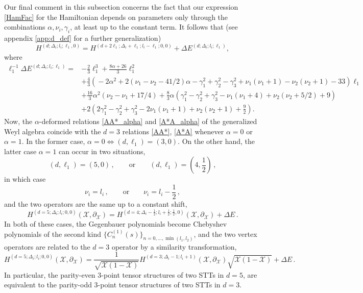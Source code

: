 \documentclass{article}
\def \Dg {\Delta}
\def \ds {\partial}
\def \ag {\alpha}
\def \cg {\gamma}
\begin{document}
Our final comment in this subsection concerns the fact that our expression \eqref{HamFac}
for the Hamiltonian depends on parameters only through the 
combinations $\ag,\nu_i,\cg_i$, 
at least up to the constant term. It follows that (see appendix \ref{app:d_def} for a 
further generalization)
\begin{equation}
    H^{(d;\Dg_i;l_i;\ell_1,0)} = H^{(d+2\ell_1;\Dg_i+\ell_1;l_i-\ell_1;0,0)} + 
    \Dg E^{(d;\Dg_i;l_i;\ell_1)},
    \label{dim_shift}
\end{equation}
where
\begin{align*}
\ell_1^{-1}\Dg E^{(d;\Dg_i;l_i;\ell_1)} =& -\frac{2}{3} \ell_1^3 + \frac{8 \ag + 26}{3}  \ell_1^2 \\
&+ \frac{4}{3}\left(\! -2\ag^2+ 2(\nu_1-\nu_2-41/2)\ag -\cg_1^2 +\cg_2^2-\cg_3^2 +
\nu_1(\nu_1+1) - \nu_2(\nu_2+1)   -33 \! \right)\! \ell_1\\
&+ \frac{16}{3} \ag^2 ( \nu_2-\nu_1 + 17/4)+ \frac{8}{3} \ag
\left(\cg_1^2-\cg_2^2+\cg_3^2-\nu_1(\nu_1+4) + \nu_2(\nu_2+5/2) +9 \right) \\
&+ 2 \left(2\cg_1^2-\cg_2^2+\cg_3^2-2\nu_1(\nu_1+1) +\nu_2(\nu_2+1) +\frac{9}{2} \right).
\end{align*}
Now, the $\ag$-deformed relations \eqref{AA*_alpha} and \eqref{A*A_alpha}  of the generalized 
Weyl algebra coincide with the $d=3$ relations \eqref{AA*}, \eqref{A*A} whenever $\ag = 0$ 
or $\ag =1$. In the former case, $\ag = 0 \iff (d,\ell_1) = (3,0)$. On the other hand, the 
latter case $\ag=1$ can occur in two situations,
\begin{equation}
(d,\ell_1) = (5,0)\,,\qquad \mathrm{or} \qquad (d,\ell_1) = (4,\frac{1}{2})\,, 
\end{equation}
in which case
\begin{equation}
\nu_i = l_i\,,\qquad \mathrm{or} \qquad \nu_i = l_i - \frac{1}{2}\,, 
\end{equation}
and the two operators are the same up to a constant shift,
\begin{equation}
    H^{(d=5;\Dg_i;l_i;0,0)}(\mathcal{X},\ds_{\mathcal{X}}) = 
    H^{(d=4;\Dg_i-\frac{1}{2};l_i+\frac{1}{2};\frac{1}{2},0)}(\mathcal{X},\ds_{\mathcal{X}})+\Dg E\,.
\end{equation}
In both of these cases, the Gegenbauer polynomials become Chebyshev polynomials of the second 
kind $\{ C_n^{(1)}(s)\}_{n=0,\dots, \min(l_1,l_2)}$, and the two vertex operators are related 
to the $d=3$ operator by a similarity transformation,
\begin{equation}
 H^{(d=5;\Dg_i;l_i;0,0)}(\mathcal{X},\ds_{\mathcal{X}})  =
    \frac{1}{\sqrt{\mathcal{X}(1-\mathcal{X})}} H^{(d=3;\Dg_i-1;l_i+1)}(\mathcal{X},
    \ds_{\mathcal{X}})    \sqrt{\mathcal{X}(1-\mathcal{X})} + \Dg E\,.
\end{equation}
In particular, the parity-even 3-point tensor structures of two STTs in $d=5$, are equivalent to the 
parity-odd 3-point tensor structures of two STTs in $d=3$.
\end{document}
